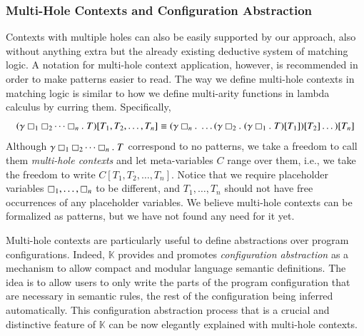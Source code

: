 \documentclass[UTF8,11pt]{article}
\theoremstyle{plain}
\theoremstyle{definition}
\theoremstyle{remark}
\newcommand{\ddd}{,\dots,}
\newcommand{\K}{\mbox{$\mathbb{K}$}\xspace}
\newcommand{\hole}{\boxempty}
\begin{document}
\subsubsection{Multi-Hole Contexts and Configuration Abstraction}
\label{sec:cfg-abstraction}

Contexts with multiple holes can also be easily supported by our approach,
also without anything extra but the already existing deductive system of
matching logic.
A notation for multi-hole context application, however, is recommended in
order to make patterns easier to read.
The way we define multi-hole contexts in matching logic
is similar to how we define multi-arity functions in lambda calculus
by curring them.
Specifically,
$$
(\gamma \hole_1 \hole_2 \dots \hole_n . \; T)[T_1,T_2,\dots,T_n]
\equiv (\gamma \hole_n .\; \dots (\gamma\hole_2.\;(\gamma\hole_1.\;T)[T_1])[T_2]\dots)[T_n]
$$
Although $\gamma \hole_1 \hole_2 \dots \hole_n . \; T$ correspond to no
patterns, we take a freedom to call them \emph{multi-hole contexts} and
let meta-variables $C$ range over them, i.e., we take the freedom to write
$C[T_1,T_2,\dots,T_n]$.
Notice that we require placeholder variables
$\hole_1 \ddd \hole_n$ to be different,
and $T_1 \ddd T_n$ should not have free occurrences
of any placeholder variables.
We believe multi-hole contexts can be formalized as patterns, but we have
not found any need for it yet.

Multi-hole contexts are particularly useful to define abstractions over
program configurations.
Indeed, \K provides and promotes \emph{configuration abstraction} as a
mechanism to allow compact and modular language semantic definitions.
The idea is to allow users to only write the parts of the program
configuration that are necessary in semantic rules, the rest of the
configuration being inferred automatically.
This configuration abstraction process that is a crucial and distinctive
feature of \K can be now elegantly explained with multi-hole contexts.
\end{document}
